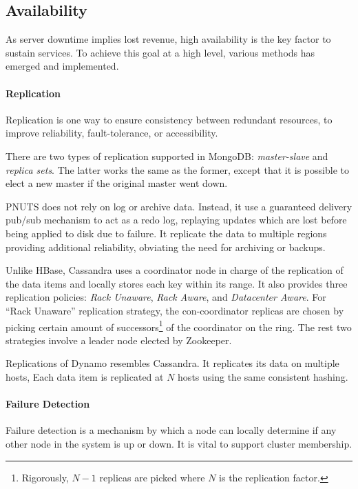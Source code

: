 \documentclass[12pt,letter]{article}
\begin{document}
\subsection{Availability}
As server downtime implies lost revenue, high availability is the key factor to sustain services. To achieve this goal at a high level, various methods has emerged and implemented.

\paragraph*{Replication}
Replication is one way to ensure consistency between redundant resources, to improve reliability, fault-tolerance, or accessibility. 

There are two types of replication supported in MongoDB: \textit{master-slave} and \textit{replica sets}.\citep{Suter2012} The latter works the same as the former, except that it is possible to elect a new master if the original master went down.

PNUTS does not rely on log or archive data. Instead, it use a guaranteed delivery pub/sub mechanism to act as a redo log, replaying updates which are lost before being applied to disk due to failure. It replicate the data to multiple regions providing additional reliability, obviating the need for archiving or backups.

Unlike HBase, Cassandra uses a coordinator node in charge of the replication of the data items and locally stores each key within its range. It also provides three replication policies: \textit{Rack Unaware}, \textit{Rack Aware}, and \textit{Datacenter Aware}. For ``Rack Unaware'' replication strategy, the con-coordinator replicas are chosen by picking certain amount of successors\footnote{Rigorously, $N-1$ replicas are picked where $N$ is the replication factor.} of the coordinator on the ring. The rest two strategies involve a leader node elected by Zookeeper.\citep{Hunt2010}

Replications of Dynamo\citep{DeCandia2007} resembles Cassandra. It replicates its data on multiple hosts, Each data item is replicated at $N$ hosts using the same consistent hashing. 

\paragraph*{Failure Detection}
Failure detection is a mechanism by which a node can locally determine if any other node in the system is up or down. It is vital to support cluster membership.
\end{document}
